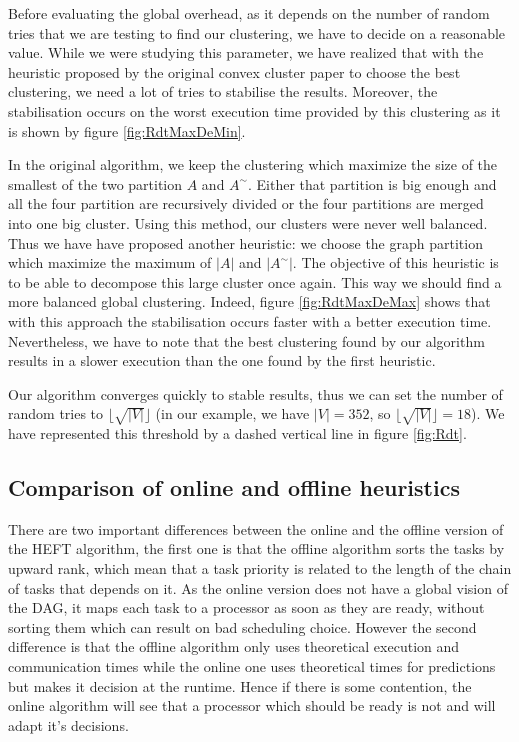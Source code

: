 \documentclass[10pt, conference, compsocconf,pdftex,dvipsnames]{IEEEtran}
\newcommand{\mytodo}[1]{\todo[inline]{#1}}
\begin{document}
Before evaluating the global overhead, as it depends on the number of random
tries that we are testing to find our clustering, we have to decide on a
reasonable value. While we were studying this parameter, we have realized that
with the heuristic proposed by the original convex cluster paper to choose the
best clustering, we need a lot of tries to stabilise the results. Moreover,
the stabilisation occurs on the worst execution time provided by this
clustering as it is shown by figure \ref{fig:RdtMaxDeMin}. 

In the original algorithm, we keep the clustering which maximize the size of
the smallest of the two partition $A$ and $A^{\sim}$. Either that partition is
big enough and all the four partition are recursively divided or the four
partitions are merged into one big cluster. Using this method, our clusters
were never well balanced. Thus we have have proposed another heuristic: we
choose the graph partition which maximize the maximum of $|A|$ and
$|A^{\sim}|$. The objective of this heuristic is to be able to decompose this
large cluster once again. This way we should find a more balanced global
clustering. Indeed, figure \ref{fig:RdtMaxDeMax} shows that with this approach
the stabilisation occurs faster with a better execution time.  Nevertheless,
we have to note that the best clustering found by our algorithm results in a
slower execution than the one found by the first heuristic.

Our algorithm converges quickly to stable results, thus we can set the number
of random tries to $\lfloor\sqrt{|V|}\rfloor$ (in our example, we have $|V|=352$, so
$\lfloor\sqrt{|V|}\rfloor=18$). We have represented this threshold by a dashed
vertical line in figure \ref{fig:Rdt}.

\subsection{Comparison of online and offline heuristics}
\label{sec:exp-exp-perf}
\mytodo{Continue re read here}

There are two important differences between the online and the offline version
of the HEFT algorithm, the first one is that the offline algorithm sorts the
tasks by upward rank, which mean that a task priority is related to the length
of the chain of tasks that depends on it. As the online version does not have
a global vision of the DAG, it maps each task to a processor as soon as they
are ready, without sorting them which can result on bad scheduling choice.
However the second difference is that the offline algorithm only uses
theoretical execution and communication times while the online one uses
theoretical times for predictions but makes it decision at the runtime. Hence
if there is some
contention, the online algorithm will see that a processor which should be
ready is not and will adapt it's decisions.
\end{document}

